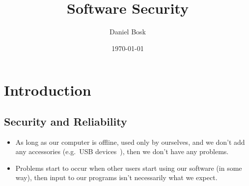 \title{%
  Software Security
}
\author{%
  Daniel Bosk
}
\date{\today}


\mode*

\begin{abstract}
  
\end{abstract}




\section{Introduction}

\subsection{Security and Reliability}

\begin{frame}
  \begin{itemize}
    \item As long as our computer is offline, used only by ourselves, and we 
      don't add any accessories (e.g.\ USB devices~\cite{ieeespectrum2014usb}), 
      then we don't have any problems.

      \pause{}

    \item Problems start to occur when other users start using our software (in 
      some way), then input to our programs isn't necessarily what we expect.

  \end{itemize}
\end{frame}

